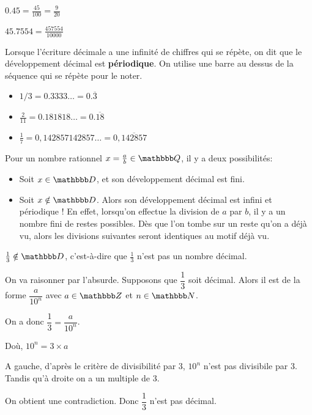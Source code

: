 \documentclass[10pt,a4paper,openany,twoside,prof]{book}
\begin{document}
\begin{ex}{}{}
	$0.45 = \frac{45}{100} = \frac{9}{20}$

	$45.7554 = \frac{457554}{10000}$
\end{ex}

\begin{notation}{}{}
	Lorsque l'écriture décimale a une infinité de chiffres qui se répète, on dit que le développement décimal est \textbf{périodique}. On utilise une barre au dessus de la séquence qui se répète pour le noter.
\end{notation}

\begin{ex}{}{}
	\begin{itemize}
		\item
		$1/3 = 0.3333\ldots = 0.\overline{3}$
		\item $\frac{2}{11} = 0.181818\ldots = 0.\overline{18}$
		\item $\frac{1}{7} = 0,142857142857\ldots = 0,\overline{142857}$
	\end{itemize}
\end{ex}

\begin{rem}{}{}
	Pour un nombre rationnel $x=\frac{a}{b}\in\Q$, il y a deux possibilités:
	\begin{itemize}
		\item Soit $x\in\D$, et son développement décimal est fini.
		\item Soit $x\notin\D$. Alors son développement décimal est infini et périodique ! En effet, lorsqu'on effectue la division de $a$ par $b$, il y a un nombre fini de restes possibles. Dès que l'on tombe sur un reste qu'on a déjà vu, alors les divisions suivantes seront identiques au motif déjà vu.
	\end{itemize}
\end{rem}

\begin{prop}{}{}
	$\frac{1}{3}\notin\D$, c'est-à-dire que $\frac{1}{3}$ n'est pas un nombre décimal.
\end{prop}

\begin{deme}{}{}
	On va raisonner par l'absurde. Supposons que $\dfrac{1}{3}$ soit décimal. Alors il est de la forme $\dfrac{a}{10^n}$ avec $a\in\Z$ et $n\in\N$.

On a donc $\dfrac{1}{3} = \dfrac{a}{10^n}$.

Doù, $10^n = 3 \times a$

A gauche, d'après le critère de divisibilité par 3, $10^n$ n'est pas divisibile par 3.
Tandis qu'à droite on a un multiple de 3.

 On obtient une contradiction. Donc $\dfrac{1}{3}$ n'est pas décimal.
\end{deme}
\end{document}
